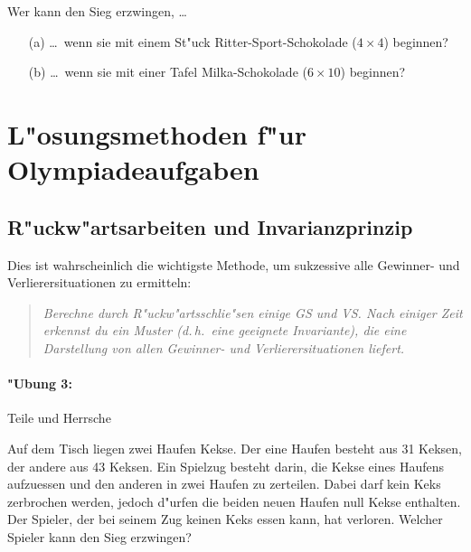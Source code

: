 \documentclass[a4paper,11pt]{article}
\begin{document}
Wer kann den Sieg erzwingen, \ldots\
\begin{itemize}
\item[(a)] \ldots\ wenn sie mit einem St"uck Ritter-Sport-Schokolade ($4\times
  4$) beginnen?
\item[(b)] \ldots\ wenn sie mit einer Tafel Milka-Schokolade ($6\times 10$)
  beginnen?
\end{itemize}

\section{L"osungsmethoden f"ur Olympiadeaufgaben}

\subsection{R"uckw"artsarbeiten und Invarianzprinzip}

Dies ist wahrscheinlich die wichtigste Methode, um sukzessive alle Gewinner-
und Verlierersituationen zu ermitteln: 
\begin{quote}\it 
  Berechne durch R"uckw"artsschlie"sen einige GS und VS. Nach einiger Zeit
  erkennst du ein Muster (d.\,h.\ eine geeignete Invariante), die eine
  Darstellung von allen Gewinner- und Verlierersituationen liefert.
\end{quote}
\paragraph*{"Ubung 3:} Teile und Herrsche

Auf dem Tisch liegen zwei Haufen Kekse. Der eine Haufen besteht aus 31 Keksen,
der andere aus 43 Keksen. Ein Spielzug besteht darin, die Kekse eines Haufens
aufzuessen und den anderen in zwei Haufen zu zerteilen. Dabei darf kein Keks
zerbrochen werden, jedoch d"urfen die beiden neuen Haufen null Kekse
enthalten. Der Spieler, der bei seinem Zug keinen Keks essen kann, hat
verloren. Welcher Spieler kann den Sieg erzwingen?
\end{document}
